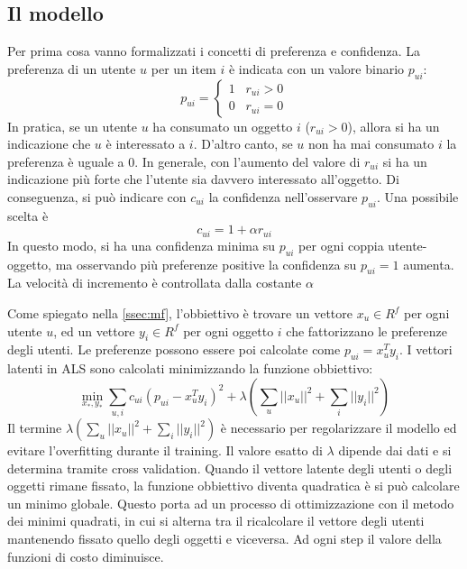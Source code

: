 \documentclass[12pt,italian]{report}
\begin{document}
\subsection{Il modello}
Per prima cosa vanno formalizzati i concetti di preferenza e confidenza. La preferenza di un utente $u$ per un item $i$ è indicata con un valore binario $p_{ui}$:
$$
p_{ui} =     \begin{cases}
				1 \;\;\; r_{ui} > 0 \\
				0 \;\;\; r_{ui} = 0
              \end{cases}
$$
In pratica, se un utente $u$ ha consumato un oggetto $i$ ($r_{ui} > 0$), allora si ha un indicazione che $u$ è interessato a $i$. D'altro canto, se $u$ non ha mai consumato $i$ la preferenza è uguale a 0. In generale, con l'aumento del valore di $r_{ui}$ si ha un indicazione più forte che l'utente sia davvero interessato all'oggetto. Di conseguenza, si può indicare con $c_{ui}$ la confidenza nell'osservare $p_{ui}$. Una possibile scelta è
$$
c_{ui} = 1 + \alpha r_{ui}
$$
In questo modo, si ha una confidenza minima su $p_{ui}$ per ogni coppia utente-oggetto, ma osservando più preferenze positive la confidenza su $p_{ui} = 1$ aumenta. La velocità di incremento è controllata dalla costante $\alpha$

Come spiegato nella \autoref{ssec:mf}, l'obbiettivo è trovare un vettore $x_u \in R^f$ per ogni utente $u$, ed un vettore $y_i \in R^f$ per ogni oggetto $i$ che fattorizzano le preferenze degli utenti. Le preferenze possono essere poi calcolate come $p_{ui} = x_u^Ty_i$. I vettori latenti in ALS sono calcolati minimizzando la funzione obbiettivo:	
$$
\min_{x_*,y_*} \sum_{u,i} c_{ui} (p_{ui} - x_u^Ty_i)^2 + 
\lambda \left( \sum_u ||x_u||^2 + \sum_i ||y_i||^2 \right)
$$
Il termine $\lambda \left( \sum_u ||x_u||^2 + \sum_i ||y_i||^2 \right)$ è necessario per regolarizzare il modello ed evitare l'overfitting durante il training. Il valore esatto di $\lambda$ dipende dai dati e si determina tramite cross validation. 
Quando il vettore latente degli utenti o degli oggetti rimane fissato, la funzione obbiettivo diventa quadratica è si può calcolare un minimo globale. Questo porta ad un processo di ottimizzazione con il metodo dei minimi quadrati, in cui si alterna tra il ricalcolare il vettore degli utenti mantenendo fissato quello degli oggetti e viceversa. Ad ogni step il valore della funzioni di costo diminuisce.
\end{document}
